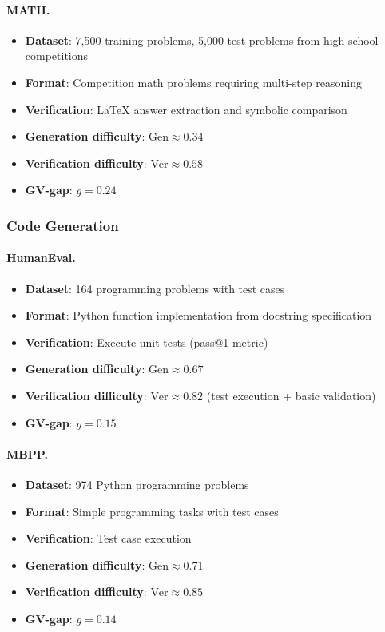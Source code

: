 \documentclass{article}
\theoremstyle{definition}
\theoremstyle{remark}
\newcommand{\Gen}{\text{Gen}}
\newcommand{\Ver}{\text{Ver}}
\begin{document}
\paragraph{MATH.}
\begin{itemize}
\item \textbf{Dataset}: 7,500 training problems, 5,000 test problems from high-school competitions
\item \textbf{Format}: Competition math problems requiring multi-step reasoning
\item \textbf{Verification}: LaTeX answer extraction and symbolic comparison
\item \textbf{Generation difficulty}: \(\Gen \approx 0.34\)
\item \textbf{Verification difficulty}: \(\Ver \approx 0.58\)
\item \textbf{GV-gap}: \(g = 0.24\)
\end{itemize}

\subsubsection{Code Generation}

\paragraph{HumanEval.}
\begin{itemize}
\item \textbf{Dataset}: 164 programming problems with test cases
\item \textbf{Format}: Python function implementation from docstring specification
\item \textbf{Verification}: Execute unit tests (pass@1 metric)
\item \textbf{Generation difficulty}: \(\Gen \approx 0.67\)
\item \textbf{Verification difficulty}: \(\Ver \approx 0.82\) (test execution + basic validation)
\item \textbf{GV-gap}: \(g = 0.15\)
\end{itemize}

\paragraph{MBPP.}
\begin{itemize}
\item \textbf{Dataset}: 974 Python programming problems
\item \textbf{Format}: Simple programming tasks with test cases
\item \textbf{Verification}: Test case execution
\item \textbf{Generation difficulty}: \(\Gen \approx 0.71\)
\item \textbf{Verification difficulty}: \(\Ver \approx 0.85\)
\item \textbf{GV-gap}: \(g = 0.14\)
\end{itemize}
\end{document}
